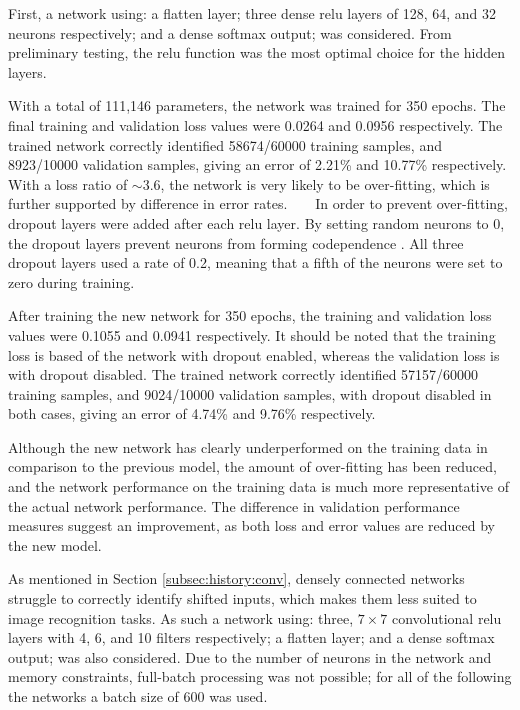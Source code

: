 First, a network using: a flatten layer; three dense relu layers of 128, 64, and
32 neurons respectively; and a dense softmax output; was considered.
From preliminary testing, the relu function was the most optimal choice for the
hidden layers.

With a total of 111,146 parameters, the network was trained for 350 epochs.
The final training and validation loss values were 0.0264 and 0.0956
respectively.
The trained network correctly identified 58674/60000 training samples, and
8923/10000 validation samples, giving an error of 2.21\% and 10.77\%
respectively.
With a loss ratio of $\sim3.6$, the network is very likely to be over-fitting,
which is further supported by difference in error rates.
\newpage
~
\vfill
{}
\vfill
~
\newpage
In order to prevent over-fitting, dropout layers were added after each relu
layer.
By setting random neurons to 0, the dropout layers prevent neurons from forming
codependence \citep{Hinton:2012:Dropout}.
All three dropout layers used a rate of 0.2, meaning that a fifth of the neurons
were set to zero during training.

After training the new network for 350 epochs, the training and validation loss
values were 0.1055 and 0.0941 respectively.
It should be noted that the training loss is based of the network with dropout
enabled, whereas the validation loss is with dropout disabled.
The trained network correctly identified 57157/60000 training samples, and
9024/10000 validation samples, with dropout disabled in both cases, giving an
error of 4.74\% and 9.76\% respectively.

Although the new network has clearly underperformed on the training data in
comparison to the previous model, the amount of over-fitting has been reduced,
and the network performance on the training data is much more representative of
the actual network performance.
The difference in validation performance measures suggest an improvement, as
both loss and error values are reduced by the new model.

As mentioned in Section \ref{subsec:history:conv}, densely connected networks
struggle to correctly identify shifted inputs, which makes them less suited to
image recognition tasks.
As such a network using: three, $7\times7$ convolutional relu layers with 4, 6,
and 10 filters respectively; a flatten layer; and a dense softmax output; was
also considered.
Due to the number of neurons in the network and memory constraints, full-batch
processing was not possible; for all of the following the networks a batch size
of 600 was used.

